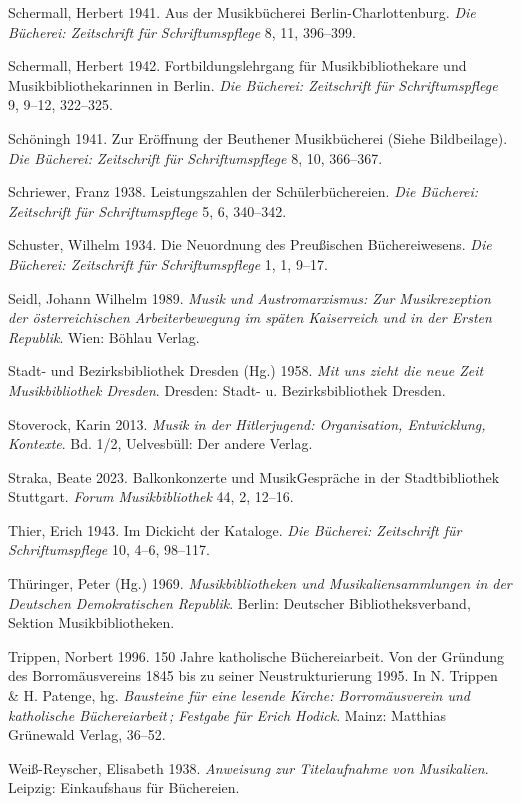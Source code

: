 \documentclass[a4paper,
fontsize=11pt,
oneside,
numbers=noperiodatend,
parskip=half-,
bibliography=totoc,
final
]{scrartcl}
\begin{document}
Schermall, Herbert 1941. Aus der Musikbücherei Berlin-Charlottenburg.
\emph{Die Bücherei: Zeitschrift für Schriftumspflege} 8, 11, 396--399.

Schermall, Herbert 1942. Fortbildungslehrgang für Musikbibliothekare und
Musikbibliothekarinnen in Berlin. \emph{Die Bücherei: Zeitschrift für
Schriftumspflege} 9, 9--12, 322--325.

Schöningh 1941. Zur Eröffnung der Beuthener Musikbücherei (Siehe
Bildbeilage). \emph{Die Bücherei: Zeitschrift für Schriftumspflege} 8,
10, 366--367.

Schriewer, Franz 1938. Leistungszahlen der Schülerbüchereien. \emph{Die
Bücherei: Zeitschrift für Schriftumspflege} 5, 6, 340--342.

Schuster, Wilhelm 1934. Die Neuordnung des Preußischen Büchereiwesens.
\emph{Die Bücherei: Zeitschrift für Schriftumspflege} 1, 1, 9--17.

Seidl, Johann Wilhelm 1989. \emph{Musik und Austromarxismus: Zur
Musikrezeption der österreichischen Arbeiterbewegung im späten
Kaiserreich und in der Ersten Republik}. Wien: Böhlau Verlag.

Stadt- und Bezirksbibliothek Dresden (Hg.) 1958. \emph{Mit uns zieht die
neue Zeit Musikbibliothek Dresden}. Dresden: Stadt- u. Bezirksbibliothek
Dresden.

Stoverock, Karin 2013. \emph{Musik in der Hitlerjugend: Organisation,
Entwicklung, Kontexte}. Bd. 1/2, Uelvesbüll: Der andere Verlag.

Straka, Beate 2023. Balkonkonzerte und MusikGespräche in der
Stadtbibliothek Stuttgart. \emph{Forum Musikbibliothek} 44, 2, 12--16.

Thier, Erich 1943. Im Dickicht der Kataloge. \emph{Die Bücherei:
Zeitschrift für Schriftumspflege} 10, 4--6, 98--117.

Thüringer, Peter (Hg.) 1969. \emph{Musikbibliotheken und
Musikaliensammlungen in der Deutschen Demokratischen Republik}. Berlin:
Deutscher Bibliotheksverband, Sektion Musikbibliotheken.

Trippen, Norbert 1996. 150 Jahre katholische Büchereiarbeit. Von der
Gründung des Borromäusvereins 1845 bis zu seiner Neustrukturierung 1995.
In N. Trippen \& H. Patenge, hg. \emph{Bausteine für eine lesende
Kirche: Borromäusverein und katholische Büchereiarbeit\,; Festgabe für
Erich Hodick}. Mainz: Matthias Grünewald Verlag, 36--52.

Weiß-Reyscher, Elisabeth 1938. \emph{Anweisung zur Titelaufnahme von
Musikalien}. Leipzig: Einkaufshaus für Büchereien.
\end{document}
